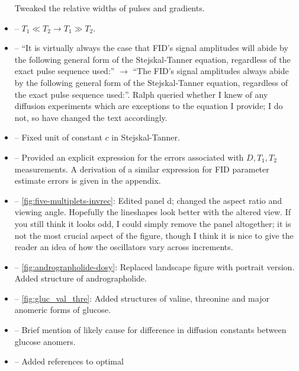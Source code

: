 \documentclass[12pt]{article}
\begin{document}
\begin{itemize}
            Tweaked the relative widths of pulses and gradients.
       \item {} -- $T_1 \ll T_2 \rightarrow T_1 \gg T_2$.
       \item {} -- ``It is virtually always the case
           that FID’s signal amplitudes will abide by the following general
           form of the Stejskal-Tanner equation, regardless of the exact pulse
           sequence used:'' $\rightarrow$
            ``The FID's signal amplitudes always abide by the following general form
            of the Stejskal-Tanner equation, regardless of the exact pulse sequence
            used:''.
            Ralph queried whether I knew of any diffusion experiments which are
            exceptions to the equation I provide; I do not, so have changed the
            text accordingly.
        \item {} -- Fixed unit of constant $c$ in
            Stejskal-Tanner.
        \item {} -- Provided an explicit expression for
            the errors associated with $D, T_1, T_2$ measurements.
            A derivation of a similar expression for FID parameter estimate
            errors is given in the appendix.
        \item {} -- \cref{fig:five-multiplets-invrec}:
            Edited panel d; changed the aspect ratio and viewing angle.
            Hopefully the lineshapes look better with the altered view. If you
            still think it looks odd, I could simply remove the panel
            altogether; it is not the most crucial aspect of the figure, though
            I think it is nice to give the reader an idea of how the
            oscillators vary across increments.
        \item {} -- \cref{fig:andrographolide-dosy}:
            Replaced landscape figure with portrait version. Added structure of
            andrographolide.
        \item {} -- \cref{fig:gluc_val_thre}: Added
            structures of valine, threonine and major anomeric forms of glucose.
        \item {} -- Brief mention of likely cause for
            difference in diffusion constants between glucose anomers.
        \item {} -- Added references to optimal

\end{itemize}
\end{document}
